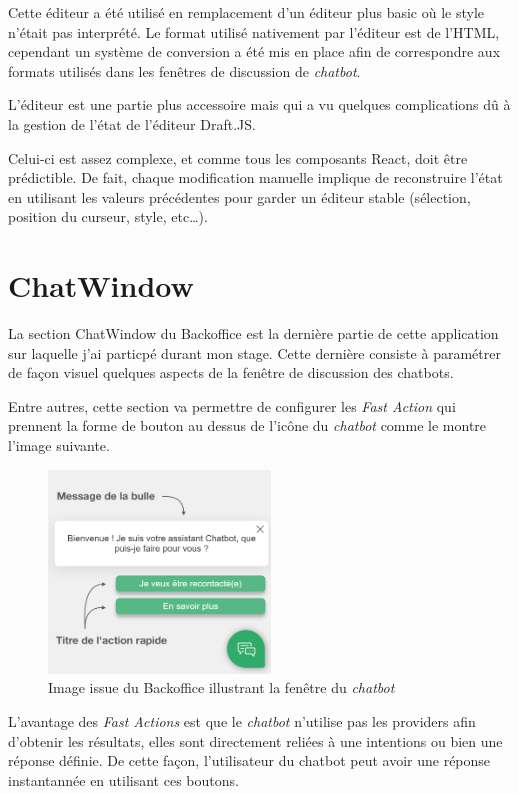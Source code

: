 \documentclass[12pt,a4paper,oneside]{scrreprt}
\begin{document}
Cette éditeur a été utilisé en remplacement d'un éditeur plus basic où le style n'était pas interprété. Le format utilisé nativement par l'éditeur est de l'HTML, cependant un système de conversion a été mis en place afin de correspondre aux formats utilisés dans les fenêtres de discussion de \textit{chatbot}.

\begin{info}
	L'éditeur est une partie plus accessoire mais qui a vu quelques complications dû à la gestion de l'état de l'éditeur Draft.JS.

	Celui-ci est assez complexe, et comme tous les composants React, doit être prédictible. De fait, chaque modification manuelle implique de reconstruire l'état en utilisant les valeurs précédentes pour garder un éditeur stable (sélection, position du curseur, style, etc\dots).
\end{info}

\section{ChatWindow}

La section ChatWindow du Backoffice est la dernière partie de cette application sur laquelle j'ai particpé durant mon stage. Cette dernière consiste à paramétrer de façon visuel quelques aspects de la fenêtre de discussion des chatbots.

Entre autres, cette section va permettre de configurer les \textit{Fast Action} qui prennent la forme de bouton au dessus de l'icône du \textit{chatbot} comme le montre l'image suivante.

\begin{figure}[!ht]
	\centering
	\includegraphics[width=5.9cm]{pictures/fa.png}
	\caption{Image issue du Backoffice illustrant la fenêtre du \textit{chatbot}}
\end{figure}

L'avantage des \textit{Fast Actions} est que le \textit{chatbot} n'utilise pas les providers afin d'obtenir les résultats, elles sont directement reliées à une intentions ou bien une réponse définie. De cette façon, l'utilisateur du chatbot peut avoir une réponse instantannée en utilisant ces boutons.
\end{document}
